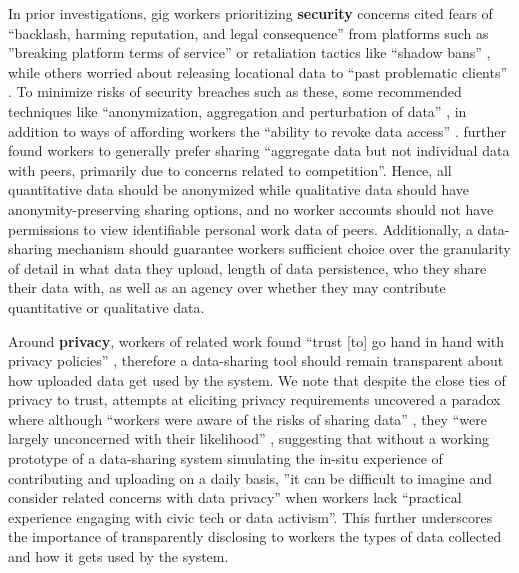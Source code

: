{In prior investigations, gig workers prioritizing \textbf{security} concerns cited fears of ``backlash, harming reputation, and legal consequence'' \cite{sousveillance} from platforms such as ''breaking platform terms of service'' or retaliation tactics like ``shadow bans'' \cite{stein2023you}, while others worried about releasing locational data to ``past problematic clients'' \cite{supporting}. To minimize risks of security breaches such as these, some recommended techniques like ``anonymization, aggregation and perturbation of data'' \cite{stein2023you}, in addition to ways of affording workers the ``ability to revoke data access'' \cite{supporting}. \citet{supporting} further found workers to generally prefer sharing ``aggregate data but not individual data with peers, primarily due to concerns related to competition''.
{Hence, all} quantitative data should be anonymized while qualitative data should have anonymity-preserving sharing options{, }and no worker accounts} should not have permissions to view identifiable personal work data of peers. {Additionally,} a data-sharing mechanism should guarantee workers sufficient choice over the granularity of detail in what data they upload, {length of data persistence,} who they share their data with, as well as an agency over whether they may contribute quantitative or qualitative data. 

{Around \textbf{privacy}, workers of related work found ``trust [to] go hand in hand with privacy policies'' \cite{supporting}, therefore a data-sharing tool} should remain transparent about how uploaded data get used by the system.
{We note that despite the close ties of privacy to trust, attempts at eliciting privacy requirements uncovered a paradox where although ``workers were aware of the risks of sharing data'' \cite{stein2023you, privacy}, they ``were largely unconcerned with their likelihood'' \cite{supporting, stein2023you}, suggesting that without a working prototype of a data-sharing system simulating the in-situ experience of contributing and uploading on a daily basis, ''it can be difficult to imagine and consider related concerns with data privacy'' when workers lack ``practical experience engaging with civic tech or data activism''. This further underscores the importance of transparently disclosing to workers the types of data collected and how it gets used by the system.}


